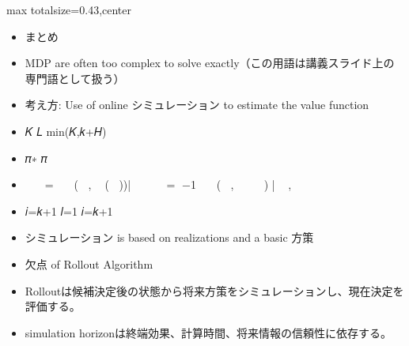 \clearpage
{}
\begin{minipage}[t]{0.405\textwidth}
\begin{adjustbox}{max totalsize={\textwidth}{0.43\textheight},center}
\begin{minipage}{\textwidth}\scriptsize
{}\begin{itemize}
\item まとめ
\item MDP are often too complex to solve exactly（この用語は講義スライド上の専門語として扱う）
\item 考え方: Use of online シミュレーション to estimate the value function
\item 𝐾 𝐿 min(𝐾,𝑘+𝐻)
\item 𝜋∗ 𝜋
\item 𝑉 𝑆𝑘𝑥 = 𝔼 ෍ 𝑅(𝑆𝑖 , 𝑋𝑖 (𝑆𝑖 ))|𝑆𝑘𝑥 𝑉෠ 𝑆𝑘𝑥 = 𝐿−1 ෍ ෍ 𝑅(𝑆𝑖 , 𝑋𝑖 𝑏 𝑆𝑖 ) |𝑆𝑘𝑥 , 𝜔𝑙
\item 𝑖=𝑘+1 𝑙=1 𝑖=𝑘+1
\item シミュレーション is based on realizations and a basic 方策
\item 欠点 of Rollout Algorithm
\end{itemize}\begin{itemize}
\item Rolloutは候補決定後の状態から将来方策をシミュレーションし、現在決定を評価する。
\item simulation horizonは終端効果、計算時間、将来情報の信頼性に依存する。
\end{itemize}
\end{minipage}
\end{adjustbox}
\end{minipage}\hfill
